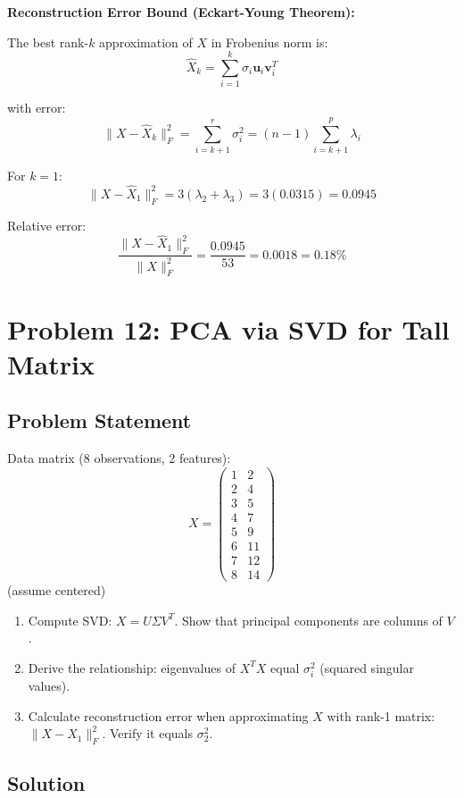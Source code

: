 \documentclass[12pt]{article}
\begin{document}
\begin{explanation}
\textbf{Reconstruction Error Bound (Eckart-Young Theorem):}

The best rank-$k$ approximation of $X$ in Frobenius norm is:
\[
\hat{X}_k = \sum_{i=1}^k \sigma_i \mathbf{u}_i \mathbf{v}_i^T
\]

with error:
\[
\|X - \hat{X}_k\|_F^2 = \sum_{i=k+1}^r \sigma_i^2 = (n-1)\sum_{i=k+1}^p \lambda_i
\]

For $k=1$:
\[
\|X - \hat{X}_1\|_F^2 = 3(\lambda_2 + \lambda_3) = 3(0.0315) = 0.0945
\]

Relative error:
\[
\frac{\|X - \hat{X}_1\|_F^2}{\|X\|_F^2} = \frac{0.0945}{53} = 0.0018 = 0.18\%
\]

\end{explanation}

\newpage
\section{Problem 12: PCA via SVD for Tall Matrix}

\subsection{Problem Statement}

Data matrix (8 observations, 2 features):
\[
X = \begin{pmatrix}
1 & 2 \\
2 & 4 \\
3 & 5 \\
4 & 7 \\
5 & 9 \\
6 & 11 \\
7 & 12 \\
8 & 14
\end{pmatrix}
\]
(assume centered)

\begin{enumerate}
\item[(a)] Compute SVD: \(X = U\Sigma V^T\). Show that principal components are columns of \(V\).
\item[(b)] Derive the relationship: eigenvalues of \(X^TX\) equal \(\sigma_i^2\) (squared singular values).
\item[(c)] Calculate reconstruction error when approximating \(X\) with rank-1 matrix: \(\|X - X_1\|_F^2\). Verify it equals \(\sigma_2^2\).
\end{enumerate}

\subsection{Solution}
\end{document}
